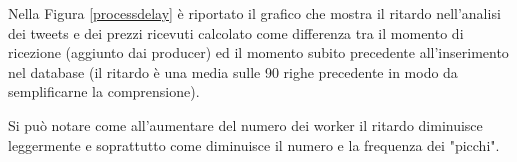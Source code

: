 Nella Figura \ref{processdelay} è riportato il grafico che mostra il ritardo nell'analisi dei tweets
e dei prezzi ricevuti calcolato come differenza tra il momento di ricezione (aggiunto dai producer)
ed il momento subito precedente all'inserimento nel database (il ritardo è una media sulle 90 righe
precedente in modo da semplificarne la comprensione).

Si può notare come all'aumentare del numero dei worker il ritardo diminuisce leggermente e
soprattutto come diminuisce il numero e la frequenza dei "picchi".
